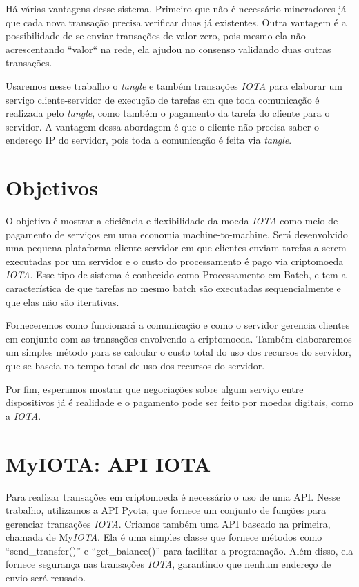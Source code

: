 \documentclass[a4paper]{article}
\begin{document}
Há várias vantagens desse sistema. Primeiro que não é necessário mineradores já que cada nova transação precisa verificar
duas já existentes. Outra vantagem é a possibilidade de se enviar transações de valor zero, pois mesmo ela não acrescentando
``valor`` na rede, ela ajudou no consenso validando duas outras transações.

Usaremos nesse trabalho o \textit{tangle} e também transações \textit{IOTA} para elaborar um serviço cliente-servidor de execução de tarefas
em que toda comunicação é realizada pelo \textit{tangle}, como também o pagamento da tarefa do cliente para o servidor. A vantagem dessa
abordagem é que o cliente não precisa saber o endereço IP do servidor, pois toda a comunicação é feita via \textit{tangle}.

\section{Objetivos}\label{sec:Goals}

O objetivo é mostrar a eficiência e flexibilidade da moeda \textit{IOTA} como meio de pagamento de serviços em uma economia
machine-to-machine. Será desenvolvido uma pequena plataforma cliente-servidor em que clientes enviam tarefas a serem
executadas por um servidor e o custo do processamento é pago via criptomoeda \textit{IOTA}. Esse tipo de sistema é conhecido
como Processamento em Batch, e tem a característica de que tarefas no mesmo batch são executadas sequencialmente e que
elas não são iterativas.

Forneceremos como funcionará a comunicação e como o servidor gerencia clientes em conjunto
com as transações envolvendo a criptomoeda. Também elaboraremos um simples método para se calcular o custo total
do uso dos recursos do servidor, que se baseia no tempo total de uso dos recursos do servidor.

Por fim, esperamos mostrar que negociações sobre algum serviço entre dispositivos já é realidade e o pagamento pode ser feito
por moedas digitais, como a \textit{IOTA}.

\section{MyIOTA: API IOTA}

Para realizar transações em criptomoeda é necessário o uso de uma API. Nesse trabalho, utilizamos a API Pyota, que fornece um conjunto
de funções para gerenciar transações \textit{IOTA}. Criamos também uma API baseado na primeira, chamada de My\textit{IOTA}. Ela é uma simples classe
que fornece métodos como ``send\_transfer()'' e ``get\_balance()'' para facilitar a programação. Além disso, ela fornece segurança
nas transações \textit{IOTA}, garantindo que nenhum endereço de envio será reusado.
\end{document}
